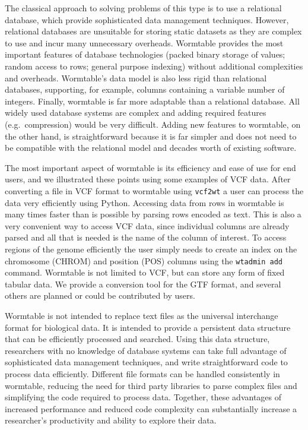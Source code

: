 \documentclass[10pt]{bmc_article}
\newenvironment{bmcformat}{\begin{raggedright}\baselineskip20pt\sloppy\setboolean{publ}{false}}{\end{raggedright}\baselineskip20pt\sloppy}
\begin{document}
\begin{bmcformat}
The classical approach to solving problems of this type 
is to use a relational database, which provide sophisticated 
data management techniques. However, relational databases are unsuitable 
for storing static datasets as they are complex to 
use and incur many unnecessary overheads.
Wormtable provides the most important features of database
technologies (packed binary storage of values; random access 
to rows; general purpose indexing) without additional complexities 
and overheads. Wormtable's data model is also less rigid
than 
relational databases, supporting, for example, columns 
containing a variable number of integers. Finally, wormtable 
is far more adaptable than a relational database.
All widely used database systems are complex 
and adding required features (e.g.\ compression) would be 
very difficult. Adding new features to wormtable, on the 
other hand, is straightforward because it is far simpler and 
does not need to be compatible with the relational model
and decades worth of existing software.

The most important aspect of wormtable is its efficiency
and ease of use for end users, and we illustrated these
points using some examples of VCF data.
After converting a file in VCF format to 
wormtable using \texttt{vcf2wt} a user can process the 
data very efficiently using Python. Accessing data from 
rows in wormtable is many times faster than is possible 
by parsing rows encoded as text.
This is also a very convenient 
way to access VCF data, since individual columns are already 
parsed and all that is needed is the name of the column of 
interest. To access regions of the genome efficiently
the user simply needs to create an index on the chromosome 
(CHROM) and position (POS) columns
using the  \texttt{wtadmin add} command. Wormtable is not 
limited to VCF, but can store 
any form of fixed tabular data. We provide a conversion 
tool for the GTF format, and several others are planned or 
could be contributed by users.

Wormtable is not intended to replace text files as the universal 
interchange format for biological data. 
It is intended to provide a persistent data structure 
that can be efficiently processed 
and searched. Using this data structure, researchers with no knowledge of 
database systems can take full advantage of sophisticated 
data management techniques, and write straightforward code to process 
data efficiently. 
Different file formats can be handled consistently 
in wormtable, reducing the need for third party libraries 
to parse complex files and simplifying the code required 
to process data.
Together, these advantages of increased performance and reduced 
code complexity can substantially increase a researcher's 
productivity and ability to explore their data.



\end{bmcformat}
\end{document}
